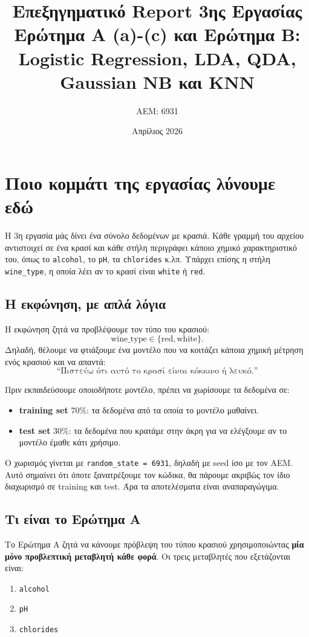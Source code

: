 \documentclass[11pt,a4paper]{article}
\title{\textbf{Επεξηγηματικό Report 3ης Εργασίας}\\[4pt]
\large Ερώτημα Α (a)-(c) και Ερώτημα Β: Logistic Regression, LDA, QDA, Gaussian NB και KNN}
\author{ΑΕΜ: 6931}
\date{Απρίλιος 2026}
\newcommand{\code}[1]{\texttt{#1}}
\begin{document}
\maketitle
\tableofcontents
\newpage

\section{Ποιο κομμάτι της εργασίας λύνουμε εδώ}

Η 3η εργασία μάς δίνει ένα σύνολο δεδομένων με κρασιά. Κάθε γραμμή του
αρχείου αντιστοιχεί σε ένα κρασί και κάθε στήλη περιγράφει κάποιο χημικό
χαρακτηριστικό του, όπως το \code{alcohol}, το \code{pH}, τα \code{chlorides}
κ.λπ. Υπάρχει επίσης η στήλη \code{wine\_type}, η οποία λέει αν το κρασί είναι
\code{white} ή \code{red}.

\subsection{Η εκφώνηση, με απλά λόγια}

Η εκφώνηση ζητά να προβλέψουμε τον τύπο του κρασιού:
\[
\text{wine\_type} \in \{\text{red}, \text{white}\}.
\]
Δηλαδή, θέλουμε να φτιάξουμε ένα μοντέλο που να κοιτάζει κάποια χημική
μέτρηση ενός κρασιού και να απαντά:
\[
\text{``Πιστεύω ότι αυτό το κρασί είναι κόκκινο ή λευκό.''}
\]

Πριν εκπαιδεύσουμε οποιοδήποτε μοντέλο, πρέπει να χωρίσουμε τα δεδομένα σε:
\begin{itemize}
    \item \textbf{training set} 70\%: τα δεδομένα από τα οποία το μοντέλο
    μαθαίνει.
    \item \textbf{test set} 30\%: τα δεδομένα που κρατάμε στην άκρη για
    να ελέγξουμε αν το μοντέλο έμαθε κάτι χρήσιμο.
\end{itemize}

Ο χωρισμός γίνεται με \code{random\_state = 6931}, δηλαδή με seed ίσο με τον
ΑΕΜ. Αυτό σημαίνει ότι όποτε ξανατρέξουμε τον κώδικα, θα πάρουμε ακριβώς τον
ίδιο διαχωρισμό σε training και test. Άρα τα αποτελέσματα είναι
αναπαραγώγιμα.

\subsection{Τι είναι το Ερώτημα Α}

Το Ερώτημα Α ζητά να κάνουμε πρόβλεψη του τύπου κρασιού χρησιμοποιώντας
\textbf{μία μόνο προβλεπτική μεταβλητή κάθε φορά}. Οι τρεις μεταβλητές που
εξετάζονται είναι:
\begin{enumerate}
    \item \code{alcohol}
    \item \code{pH}
    \item \code{chlorides}
\end{enumerate}
\end{document}
